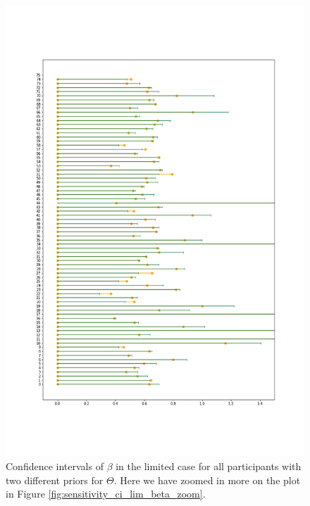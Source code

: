 \begin{figure}
    \centering
    \includegraphics[scale=0.37]{pictures/Sensitivity/ci_lim_beta_zoom2.png}
    \caption[CIs for $\beta$ in the limited case, zoomed]{   Confidence intervals of $\beta$ in the limited case for all participants with two different priors for $\Theta$. Here we have zoomed in more on the plot in Figure \ref{fig:sensitivity_ci_lim_beta_zoom}.}
    \label{fig:sensitivity_ci_lim_beta_zoom2}
\end{figure}